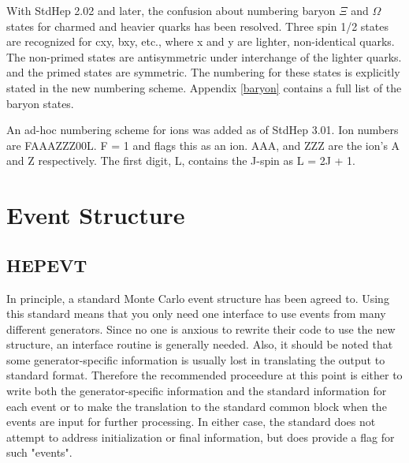 With StdHep 2.02 and later, the confusion about numbering
baryon $\Xi$ and $\Omega$ states for charmed
and heavier quarks has been resolved.  Three spin 1/2 states are recognized
for cxy, bxy, etc., where x and y are lighter, non-identical quarks.
The non-primed states are antisymmetric under interchange of the lighter quarks.
and the primed states are symmetric.  The numbering for these states is
explicitly stated in the new numbering scheme.
Appendix \ref{baryon} contains a full list of the baryon states.

An ad-hoc numbering scheme for ions was added as of StdHep 3.01.
Ion numbers are FAAAZZZ00L. F = 1 and flags this
as an ion.  AAA, and ZZZ are the ion's A and Z respectively.
The first digit, L, contains the J-spin as L = 2J + 1.

\section { Event Structure }
\subsection { HEPEVT }

In principle, a standard Monte Carlo event structure has been agreed to.
Using this standard means that you only need one interface to use events
from many different generators.  Since no one is anxious to rewrite their
code to use the new structure, an interface routine is generally needed.
Also, it should be noted that some generator-specific information is usually
lost in translating the output to standard format.  Therefore the recommended
proceedure at this point is either to write both the generator-specific
information and the standard information for each event or to make
the translation to the standard common block when the events are input for
further processing.  In either case, the standard does not attempt to address
initialization or final information, but does provide a flag for such "events".

